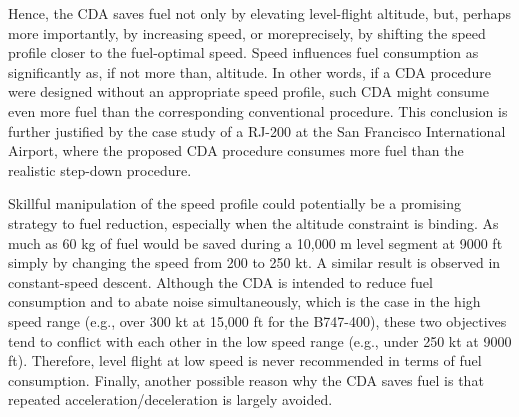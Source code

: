 \documentclass{aer1315-pretty}
\begin{document}
\begin{itemize}
Hence, the CDA saves fuel not only by elevating level-flight altitude, but, perhaps more importantly, by increasing speed, or moreprecisely, by shifting the speed profile closer to the fuel-optimal speed. Speed influences fuel consumption as significantly as, if not more than, altitude. In other words, if a CDA procedure were designed without an appropriate speed profile, such CDA might consume even more fuel than the corresponding conventional procedure. This conclusion is further justified by the case study of a RJ-200 at the San Francisco International Airport, where the proposed CDA procedure consumes more fuel than the realistic step-down procedure.

Skillful manipulation of the speed profile could potentially be a promising strategy to fuel reduction, especially when the altitude constraint is binding. As much as 60 kg of fuel would be saved during a 10,000 m level segment at 9000 ft simply by changing the speed from 200 to 250 kt. A similar result is observed in constant-speed descent.
Although the CDA is intended to reduce fuel consumption and to abate noise simultaneously, which is the case in the high speed range (e.g., over 300 kt at 15,000 ft for the B747-400), these two objectives tend to conflict with each other in the low speed range (e.g., under 250 kt at 9000 ft).  Therefore, level flight at low speed is never recommended in terms of fuel consumption. Finally, another possible reason why the CDA saves fuel is that repeated acceleration/deceleration is largely avoided.


\end{itemize}
\end{document}

